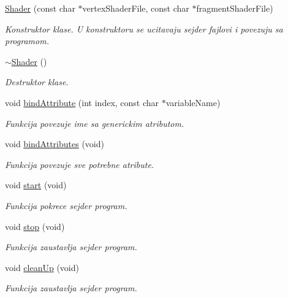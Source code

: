 \begin{DoxyCompactItemize}
\item 
\hyperlink{classshader_1_1Shader_a8346a24ed22edf1b1736cbe02dd27758}{Shader} (const char $\ast$vertex\+Shader\+File, const char $\ast$fragment\+Shader\+File)
\begin{DoxyCompactList}\small\item\em Konstruktor klase. U konstruktoru se ucitavaju sejder fajlovi i povezuju sa programom. \end{DoxyCompactList}\item 
\hyperlink{classshader_1_1Shader_a8d9b3ffe1ba804f91a26bd79a7588a34}{$\sim$\+Shader} ()
\begin{DoxyCompactList}\small\item\em Destruktor klase. \end{DoxyCompactList}\item 
void \hyperlink{classshader_1_1Shader_a879993e6f90506d6c9c0b9a39d1caebb}{bind\+Attribute} (int index, const char $\ast$variable\+Name)
\begin{DoxyCompactList}\small\item\em Funkcija povezuje ime sa generickim atributom. \end{DoxyCompactList}\item 
void \hyperlink{classshader_1_1Shader_a0b80abf1266063b5b2dea30422dd3358}{bind\+Attributes} (void)
\begin{DoxyCompactList}\small\item\em Funkcija povezuje sve potrebne atribute. \end{DoxyCompactList}\item 
void \hyperlink{classshader_1_1Shader_adb075db73fc6fc5e6bf4d924bc11e6c6}{start} (void)
\begin{DoxyCompactList}\small\item\em Funkcija pokrece sejder program. \end{DoxyCompactList}\item 
void \hyperlink{classshader_1_1Shader_a47fa58ad9ede974fe115c73c15c59691}{stop} (void)
\begin{DoxyCompactList}\small\item\em Funkcija zaustavlja sejder program. \end{DoxyCompactList}\item 
void \hyperlink{classshader_1_1Shader_af79c5615b39eae7e6368508429645c33}{clean\+Up} (void)
\begin{DoxyCompactList}\small\item\em Funkcija zaustavlja sejder program. \end{DoxyCompactList}\item 

\end{DoxyCompactItemize}
